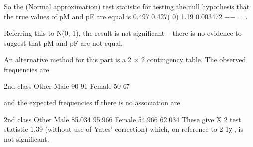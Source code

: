 \documentclass[a4paper,12pt]{article}
\begin{document}
So the (Normal approximation) test statistic for testing the null hypothesis that the true values of pM and pF are equal is 
 0.497 0.427( 0) 1.19 0.003472 −− = . 
 
Referring this to N(0, 1), the result is not significant  –  there is no evidence to suggest that pM and pF are not equal. 
 
 
 
An alternative method for this part is a 2 × 2 contingency table.  The observed frequencies are 
 
 2nd class Other Male 90 91 Female 50 67 
 
and the expected frequencies if there is no association are 
 
 2nd class Other Male 85.034 95.966 Female 54.966 62.034 
 These give X 2 test statistic 1.39 (without use of Yates' correction) which, on reference to 2 1χ , is not significant. 
\end{document}

